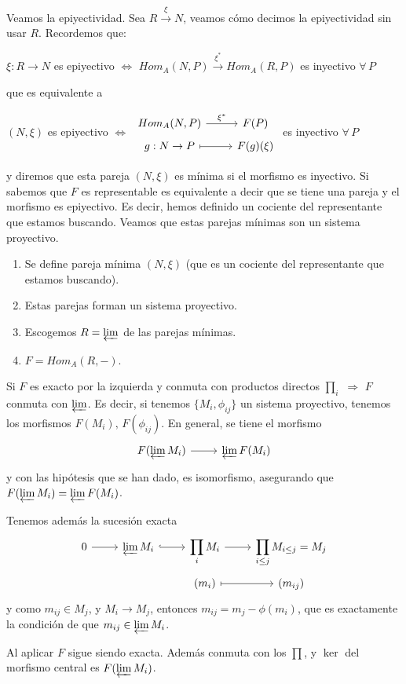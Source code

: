 Veamos la epiyectividad. Sea $R \overset{\xi}{\longrightarrow} N$, veamos c\'omo decimos la epiyectividad sin usar $R$. Recordemos que:
\begin{center}
$\xi: R \to N$ es epiyectivo $\iff$ $Hom_A(N, P) \overset{\xi^*}{\longrightarrow} Hom_A(R, P)$ es inyectivo $\forall \, P$    
\end{center}
que es equivalente a 
\begin{center}
$(N,\xi)$ es epiyectivo $\iff$ $\bt Hom_A(N, P) \rar{\xi^*} & F(P) \\[-5mm] g:N \to P \rarmaps & F(g)(\xi) \et$ es inyectivo $\forall \, P$ \end{center}
y diremos que esta pareja $(N,\xi)$ es m\'inima si el morfismo es inyectivo. Si sabemos que $F$ es representable es equivalente a decir que se tiene una pareja y el morfismo es epiyectivo. Es decir, hemos definido un cociente del representante que estamos buscando. Veamos que estas parejas m\'inimas son un sistema proyectivo. 
\begin{enumerate}
    \item Se define pareja m\'inima $(N, \xi)$ (que es un cociente del representante que estamos buscando).
    \item Estas parejas forman un sistema proyectivo. 
    \item Escogemos $R = \varprojlim$ de las parejas m\'inimas.
    \item $F=Hom_A(R,-)$.
\end{enumerate}

Si $F$ es exacto por la izquierda y conmuta con productos directos $\prod_i$ $\Rightarrow$ $F$ conmuta con $\varprojlim$. Es decir, si tenemos $\{M_i, \phi_{ij}\}$ un sistema proyectivo, tenemos los morfismos $F(M_i), \, F(\phi_{ij})$. En general, se tiene el morfismo
$$\bt F(\varprojlim M_i) \rar & \varprojlim F(M_i) \et$$
y con las hip\'otesis que se han dado, es isomorfismo, asegurando que $ F(\varprojlim M_i) = \varprojlim F(M_i)$. 

Tenemos adem\'as la sucesi\'on exacta
$$\bt 0 \rar & \varprojlim M_i \rar[hook] & \displaystyle \prod_iM_i \rar & \displaystyle  \prod_{i \leq j} M_{i\leq j}=M_j  \\[-5mm] & & (m_i) \rarmaps & (m_{ij}) \et$$ y como $m_{ij}\in M_j$, y $M_i \longrightarrow M_j$, entonces $m_{ij} = m_j - \phi(m_i)$, que es exactamente la condici\'on de que $m_{ij}\in \varprojlim M_i$. 

Al aplicar $F$ sigue siendo exacta. Adem\'as conmuta con los $\prod$, y $\ker$ del morfismo central es $F (\varprojlim M_i)$. 
